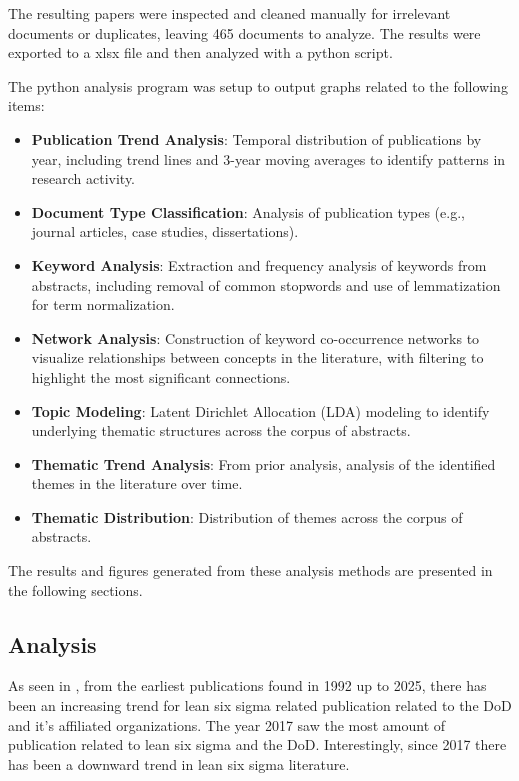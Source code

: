 \documentclass{article}
\begin{document}
		The resulting papers were inspected and cleaned manually for irrelevant documents or duplicates, leaving 465 documents to analyze.
		The results were exported to a xlsx file and then analyzed with a python script.

		The python analysis program was setup to output graphs related to the following items:

		\begin{itemize}
			\item \textbf{Publication Trend Analysis}: Temporal distribution of publications by year, including trend lines and 3-year moving averages to identify patterns in research activity.
			
			\item \textbf{Document Type Classification}: Analysis of publication types (e.g., journal articles, case studies, dissertations).
			
			\item \textbf{Keyword Analysis}: Extraction and frequency analysis of keywords from abstracts, including removal of common stopwords and use of lemmatization for term normalization.
			
			\item \textbf{Network Analysis}: Construction of keyword co-occurrence networks to visualize relationships between concepts in the literature, with filtering to highlight the most significant connections.
			
			\item \textbf{Topic Modeling}: Latent Dirichlet Allocation (LDA) modeling to identify underlying thematic structures across the corpus of abstracts.
			
			\item \textbf{Thematic Trend Analysis}: From prior analysis, analysis of the identified themes in the literature over time.

			\item \textbf{Thematic Distribution}: Distribution of themes across the corpus of abstracts.
		\end{itemize}

		The results and figures generated from these analysis methods are presented in the following sections.

	\subsection{Analysis}

		As seen in , from the earliest publications found in 1992 up to 2025, there has been an increasing trend for lean six sigma related publication related to the DoD and it's affiliated organizations.
		The year 2017 saw the most amount of publication related to lean six sigma and the DoD.
		Interestingly, since 2017 there has been a downward trend in lean six sigma literature.
\end{document}
